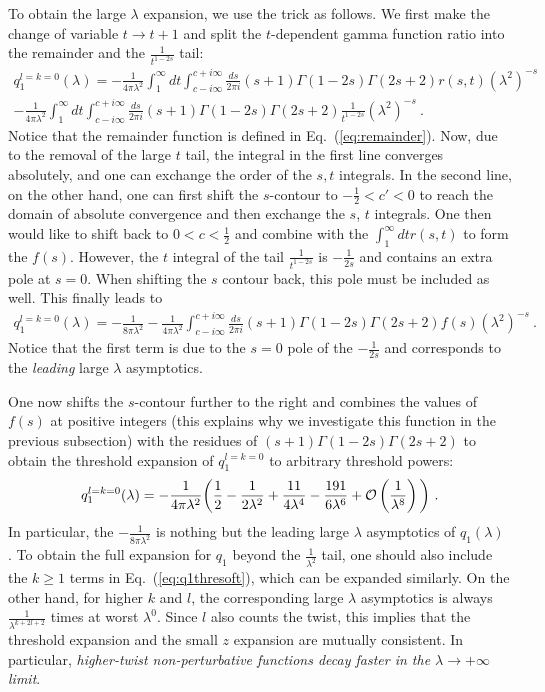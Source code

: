 \documentclass[a4paper,11pt]{article}
\begin{document}
To obtain the large $\lambda$ expansion, we use the trick as follows. We first make the change of variable $t\rightarrow t+1$ and split the $t$-dependent gamma function ratio into the remainder and the $\frac{1}{t^{1-2s}}$ tail:
\begin{align}
q_1^{l=k=0}(\lambda)=-\frac{1}{4\pi\lambda^2}\int_{1}^{\infty} dt \int_{c-i\infty}^{c+i\infty} \frac{ds}{2\pi i}(s+1)\Gamma (1-2 s)  \Gamma(2s+2)r(s,t)\left(\lambda^2\right)^{-s} \nonumber \\ 
-\frac{1}{4\pi\lambda^2}\int_{1}^{\infty} dt \int_{c-i\infty}^{c+i\infty} \frac{ds}{2\pi i}(s+1)\Gamma (1-2 s)  \Gamma(2s+2)\frac{1}{t^{1-2s}}\left(\lambda^2\right)^{-s} \ .
\end{align}
Notice that the remainder function is defined in Eq.~(\ref{eq:remainder}). Now, due to the removal of the large $t$ tail, the integral in the first line converges absolutely, and one can exchange the order of the $s,t$ integrals. In the second line, on the other hand, one can first shift the $s$-contour to $-\frac{1}{2}<c'<0$ to reach the domain of absolute convergence and then exchange the $s$, $t$ integrals. One then would like to shift back to $0<c<\frac{1}{2}$ and combine with the $\int_1^{\infty} dt r(s,t)$ to form the $f(s)$. However, the $t$ integral of the tail $\frac{1}{t^{1-2s}}$ is $-\frac{1}{2s}$ and contains an extra pole at $s=0$. When shifting the $s$ contour back, this pole must be included as well. This finally leads to
\begin{align}
q_1^{l=k=0}(\lambda)=-\frac{1}{8\pi \lambda^2}-\frac{1}{4\pi\lambda^2} \int_{c-i\infty}^{c+i\infty} \frac{ds}{2\pi i}(s+1)\Gamma (1-2 s)  \Gamma(2s+2)f(s)\left(\lambda^2\right)^{-s} \ .
\end{align}
Notice that the first term is due to the $s=0$ pole of the $-\frac{1}{2s}$ and corresponds to the {\it leading} large $\lambda$ asymptotics.  


One now shifts the $s$-contour further to the right and combines the values of $f(s)$ at positive integers (this explains why we investigate this function in the previous subsection) with the residues of $(s+1)\Gamma(1-2s)\Gamma(2s+2)$  to obtain the threshold expansion of $q_1^{l=k=0}$ to arbitrary threshold powers:
\begin{align}
q_1^{l=k=0}(\lambda)=-\frac{1}{4\pi \lambda^2}\bigg(\frac{1}{2}-\frac{1}{2\lambda^2}+\frac{11}{4\lambda^4}-\frac{191}{6\lambda^6}+{\cal O}\left(\frac{1}{\lambda^8}\right)\bigg) \ .
\end{align}
In particular, the $-\frac{1}{8\pi \lambda^2}$ is nothing but the leading large $\lambda$ asymptotics of $q_1(\lambda)$ . To obtain the full expansion for $q_1$ beyond the $\frac{1}{\lambda^2}$ tail, one should also include the $k \ge 1$ terms in Eq.~(\ref{eq:q1thresoft}), which can be expanded similarly. On the other hand, for higher $k$ and $l$, the corresponding large $\lambda$ asymptotics is always $\frac{1}{\lambda^{k+2l+2}}$ times at worst $\lambda^0$. Since $l$ also counts the twist, this implies that the threshold expansion and the small $z$ expansion are mutually consistent. In particular, {\it higher-twist non-perturbative functions decay faster in the $\lambda \rightarrow +\infty$ limit}. 
\end{document}
